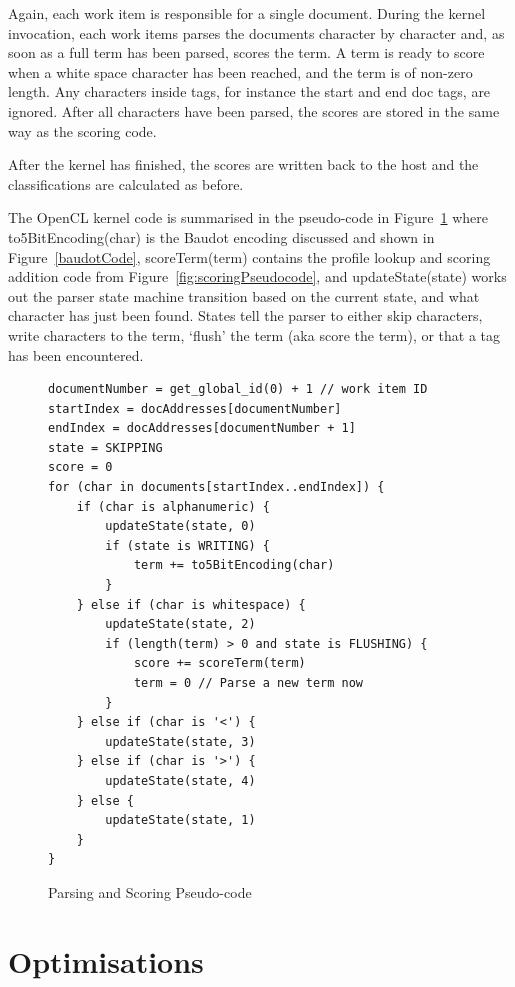 Again, each work item is responsible for a single document. During the kernel
invocation, each work items parses the documents character by character and, as
soon as a full term has been parsed, scores the term. A term is ready to score
when a white space character has been reached, and the term is of non-zero
length. Any characters inside tags, for instance the start and end doc tags, are
ignored. After all characters have been parsed, the scores are stored in the
same way as the scoring code.

After the kernel has finished, the scores are written back to the host and the
classifications are calculated as before.

The OpenCL kernel code is summarised in the pseudo-code in
Figure~\ref{fig:parsingScoringPseudocode} where to5BitEncoding(char) is the
Baudot encoding discussed and shown in Figure~\ref{baudotCode}, scoreTerm(term)
contains the profile lookup and scoring addition code from
Figure~\ref{fig:scoringPseudocode}, and updateState(state) works out the parser
state machine transition based on the current state, and what character has just
been found. States tell the parser to either skip characters, write characters
to the term, `flush' the term (aka score the term), or that a tag has been
encountered.

\begin{figure}
\begin{verbatim}
documentNumber = get_global_id(0) + 1 // work item ID
startIndex = docAddresses[documentNumber]
endIndex = docAddresses[documentNumber + 1]
state = SKIPPING
score = 0
for (char in documents[startIndex..endIndex]) {
    if (char is alphanumeric) {
        updateState(state, 0)
        if (state is WRITING) {
            term += to5BitEncoding(char)
        }
    } else if (char is whitespace) {
        updateState(state, 2)
        if (length(term) > 0 and state is FLUSHING) {
            score += scoreTerm(term)
            term = 0 // Parse a new term now
        }
    } else if (char is '<') {
        updateState(state, 3)
    } else if (char is '>') {
        updateState(state, 4)
    } else {
        updateState(state, 1)
    }
}
\end{verbatim}
\caption{Parsing and Scoring Pseudo-code}
\label{fig:parsingScoringPseudocode}
\end{figure}

\section{Optimisations}

